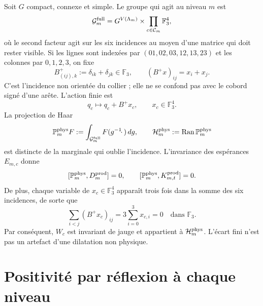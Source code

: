 Soit $G$ compact, connexe et simple. Le groupe qui agit au niveau $m$ est
\[
 \mathcal G_m^{\rm full}
 =G^{V(\Lambda_m)}\times
  \prod_{c\in\mathcal C_m}\mathbb F_3^4,
\]
où le second facteur agit sur les six incidences au moyen d’une matrice
qui doit rester visible. Si les lignes sont indexées par
$(01,02,03,12,13,23)$ et les colonnes par $0,1,2,3$, on fixe
\begin{equation}\label{eq:pdf2-ym-incidence-matrix}
 B^+_{(ij),k}:=\delta_{ik}+\delta_{jk}\in\mathbb F_3,
 \qquad
 (B^+x)_{ij}=x_i+x_j.
\end{equation}
C’est l’incidence non orientée du collier ; elle ne se confond pas avec le
cobord signé d’une arête. L’action finie est
\begin{equation}\label{eq:pdf2-ym-incidence-action}
 q_c\longmapsto q_c+B^+x_c,
 \qquad x_c\in\mathbb F_3^4.
\end{equation}
La projection de Haar
\begin{equation}\label{eq:pdf2-ym-proyeccion-fisica}
 \mathbb P_m^{\rm phys}F
 :=\int_{\mathcal G_m^{\rm full}}F(g^{-1}\!\cdot\,)\,dg,
 \qquad
 \mathcal H_m^{\rm phys}:=\operatorname{Ran}\mathbb P_m^{\rm phys}
\end{equation}
est distincte de la marginale qui oublie l'incidence. L'invariance des espérances $E_{m,c}$ donne
\begin{equation}\label{eq:pdf2-ym-reduccion}
 [\mathbb P_m^{\rm phys},D_m^{\rm prod}]=0,
 \qquad
 [\mathbb P_m^{\rm phys},K_{m,t}^{\rm prod}]=0.
\end{equation}
De plus, chaque variable de $x_c\in\mathbb F_3^4$ apparaît trois fois dans la somme des
six incidences, de sorte que
\begin{equation}\label{eq:pdf2-ym-incidence-conservation}
 \sum_{i<j}(B^+x_c)_{ij}
 =3\sum_{i=0}^3x_{c,i}=0
 \quad\text{dans }\mathbb F_3.
\end{equation}
Par conséquent, $W_c$ est invariant de
jauge et appartient à $\mathcal H_m^{\rm phys}$. L’écart fini n’est pas un
artefact d’une dilatation non physique.

\section{Positivité par réflexion à chaque niveau}

